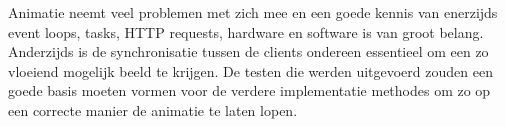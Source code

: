 Animatie neemt veel problemen met zich mee en een goede kennis van enerzijds event loops, tasks, HTTP requests, hardware en software is van groot belang. Anderzijds is de synchronisatie tussen de clients ondereen essentieel om een zo vloeiend mogelijk beeld te krijgen. De testen die werden uitgevoerd zouden een goede basis moeten vormen voor de verdere implementatie methodes om zo op een correcte manier de animatie te laten lopen.